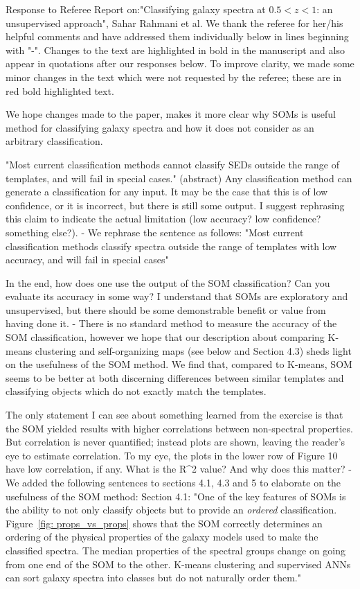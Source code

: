 Response to Referee Report on:"Classifying galaxy spectra at $0.5<z<1$: an unsupervised approach", Sahar Rahmani et al. 
We thank the referee for her/his helpful comments and have addressed them individually below in lines beginning with "-". Changes to the text are highlighted in bold in the manuscript and also appear in quotations after our responses below. To improve clarity, we made some minor changes in the text which were not requested by the referee; these are in red bold highlighted text. 

We hope changes made to the paper, makes it more clear why SOMs is useful method for classifying galaxy spectra and how it does not consider as an arbitrary classification. 


"Most current classification methods cannot classify SEDs outside the range of templates, and will fail in special cases." (abstract)
Any classification method can generate a classification for any input.  It may be the case that this is of low confidence, or it is incorrect, but there is still some output.  I suggest rephrasing this claim to indicate the actual limitation (low accuracy? low confidence? something else?).
	- We rephrase the sentence as follows:
	    "Most current classification methods classify spectra outside the
		range of templates with low accuracy, and will fail in special cases"

In the end, how does one use the output of the SOM classification? Can you evaluate its accuracy in some way?  I understand that SOMs are exploratory and unsupervised, but there should be some demonstrable benefit or value from having done it.
    - There is no standard method to measure the accuracy of the SOM classification, however we hope that our description about comparing K-means clustering and self-organizing maps (see below and Section 4.3) sheds light on the usefulness of the SOM method. We find that, compared to K-means, SOM seems to be better at both discerning differences between similar templates and classifying objects which do not exactly match the templates.


The only statement I can see about something learned from the exercise is that the SOM yielded results with higher correlations between non-spectral properties.  But correlation is never quantified; instead plots are shown, leaving the reader's eye to estimate correlation.  To my eye, the plots in the lower row of Figure 10 have low correlation, if any.  What is the R^2 value?  And why does this matter? 
    - We added the following sentences to sections 4.1, 4.3 and 5 to elaborate on the usefulness of the SOM method:
    Section 4.1:
	    "One of the key features of SOMs is the ability to not only classify objects but to provide an {\em ordered} classification. 
       Figure~\ref{fig: props_vs_props} shows that the SOM correctly determines an ordering of the physical properties of the galaxy models used to make the classified spectra. 
       The median properties of the spectral groups change on going from one end of the SOM to the other.
       K-means clustering and supervised ANNs can sort galaxy spectra into classes but do not naturally order them."
	 
